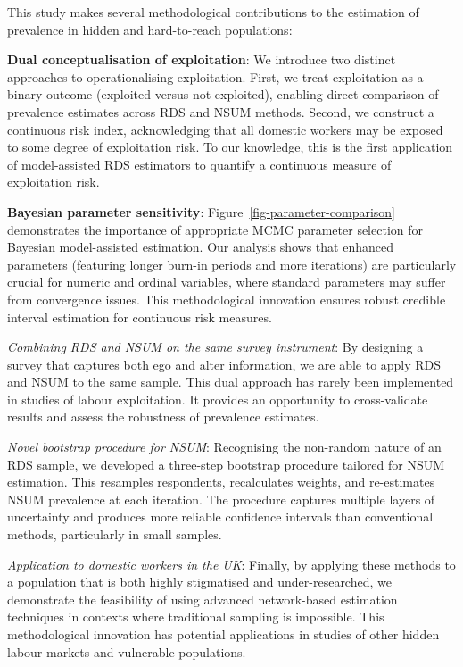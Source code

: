 \documentclass[
  12pt,
  letterpaper,
  DIV=11,
  numbers=noendperiod]{scrartcl}
\theoremstyle{plain}
\theoremstyle{definition}
\begin{document}
This study makes several methodological contributions to the estimation
of prevalence in hidden and hard-to-reach populations:

\textbf{Dual conceptualisation of exploitation}: We introduce two
distinct approaches to operationalising exploitation. First, we treat
exploitation as a binary outcome (exploited versus not exploited),
enabling direct comparison of prevalence estimates across RDS and NSUM
methods. Second, we construct a continuous risk index, acknowledging
that all domestic workers may be exposed to some degree of exploitation
risk. To our knowledge, this is the first application of model-assisted
RDS estimators to quantify a continuous measure of exploitation risk.

\textbf{Bayesian parameter sensitivity}:
Figure~\ref{fig-parameter-comparison} demonstrates the importance of
appropriate MCMC parameter selection for Bayesian model-assisted
estimation. Our analysis shows that enhanced parameters (featuring
longer burn-in periods and more iterations) are particularly crucial for
numeric and ordinal variables, where standard parameters may suffer from
convergence issues. This methodological innovation ensures robust
credible interval estimation for continuous risk measures.

\emph{Combining RDS and NSUM on the same survey instrument}: By
designing a survey that captures both ego and alter information, we are
able to apply RDS and NSUM to the same sample. This dual approach has
rarely been implemented in studies of labour exploitation. It provides
an opportunity to cross-validate results and assess the robustness of
prevalence estimates.

\emph{Novel bootstrap procedure for NSUM}: Recognising the non-random
nature of an RDS sample, we developed a three-step bootstrap procedure
tailored for NSUM estimation. This resamples respondents, recalculates
weights, and re-estimates NSUM prevalence at each iteration. The
procedure captures multiple layers of uncertainty and produces more
reliable confidence intervals than conventional methods, particularly in
small samples.

\emph{Application to domestic workers in the UK}: Finally, by applying
these methods to a population that is both highly stigmatised and
under-researched, we demonstrate the feasibility of using advanced
network-based estimation techniques in contexts where traditional
sampling is impossible. This methodological innovation has potential
applications in studies of other hidden labour markets and vulnerable
populations.
\end{document}
